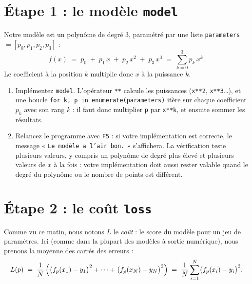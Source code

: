 \documentclass[11pt]{article}
\newcommand{\code}[1]{\texttt{#1}}
\newcommand{\fonction}[1]{\code{#1}}
\begin{document}
\section*{Étape 1 : le modèle \hfill \fonction{model}}

Notre modèle est un polynôme de degré 3, paramétré par une liste
\code{parameters} $= [p_0, p_1, p_2, p_3]$ :
\[
  f(x) \;=\; p_0 \;+\; p_1\,x \;+\; p_2\,x^2 \;+\; p_3\,x^3
  \;=\; \sum_{k=0}^{3} p_k\,x^k .
\]
Le coefficient à la position $k$ multiplie donc $x$ à la puissance $k$.

\begin{enumerate}[label=\textbf{Q\arabic*.}]
  \item Implémentez \fonction{model}. L'opérateur \code{**} calcule les
        puissances (\code{x**2}, \code{x**3}\ldots), et une boucle
        \code{for k, p in enumerate(parameters)} itère sur chaque
        coefficient $p_k$ avec son rang $k$ : il faut donc multiplier \code{p} par
        \code{x**k}, et ensuite sommer les résultats.
  \item Relancez le programme avec \code{F5} : si votre implémentation
        est correcte, le message « \code{Le modèle a l'air bon.} »
        s'affichera. La vérification teste plusieurs valeurs, y compris
        un polynôme de degré plus élevé et plusieurs valeurs de $x$ à la
        fois : votre implémentation doit aussi rester valable quand le
        degré du polynôme ou le nombre de points est différent.
\end{enumerate}

\section*{Étape 2 : le coût \hfill \fonction{loss}}

Comme vu ce matin, nous notons $L$ le \emph{coût} : le score du modèle
pour un jeu de paramètres. Ici (comme dans la plupart des modèles à
sortie numérique), nous prenons la moyenne des carrés des erreurs :
\[
  L(p) \;=\; \frac{1}{N}\,\Bigl( \bigl(f_p(x_1) - y_1\bigr)^2 + \cdots
  + \bigl(f_p(x_N) - y_N\bigr)^2 \Bigr)
  \;=\; \frac{1}{N} \sum_{i=1}^{N} \bigl( f_p(x_i) - y_i \bigr)^2 .
\]
\end{document}
